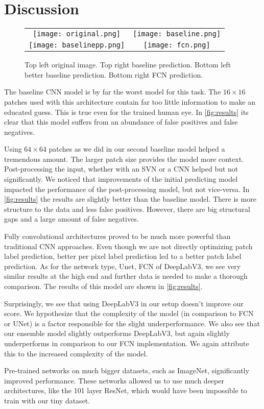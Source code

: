 \section{Discussion}
\begin{figure}[h]
    \centering
    \begin{tabular}{cc}
        \texttt{[image: original.png]} & \texttt{[image: baseline.png]} \\
        \texttt{[image: baselinepp.png]} & \texttt{[image: fcn.png]} \\
    \end{tabular}
    \caption{Top left original image. Top right baseline prediction. Bottom left better baseline prediction. Bottom right FCN prediction.}
    \label{fig:results}
\end{figure}

The baseline CNN model is by far the worst model for this task. The $16 \times 16$ patches used with this architecture contain far too little information to make an educated guess. This is true even for the trained human eye. In \autoref{fig:results} its clear that this model suffers from an abundance of false positives and false negatives.

Using $64 \times 64$ patches as we did in our second baseline model helped a tremendous amount. The larger patch size provides the model more context. Post-processing the input, whether with an SVN or a CNN helped but not significantly. We noticed that improvements of the initial predicting model impacted the performance of the post-processing model, but not vice-versa. In \autoref{fig:results} the results are slightly better than the baseline model. There is more structure to the data and less false positives. However, there are big structural gaps and a large amount of false negatives.

Fully convolutional architectures proved to be much more powerful than traditional CNN approaches. Even though we are not directly optimizing patch label prediction, better per pixel label prediction led to a better patch label prediction. As for the network type, Unet, FCN of DeepLabV3, we see very similar results at the high end and further data is needed to make a thorough comparison. The results of this model are shown in \autoref{fig:results}.

Surprisingly, we see that using DeepLabV3 in our setup doesn't improve our score. We hypothesize that the complexity of the model (in comparison to FCN or UNet) is a factor responsible for the slight underperformance. We also see that our ensemble model slightly outperforms DeepLabV3, but again slightly underperforms in comparison to our FCN implementation. We again attribute this to the increased complexity of the model.

Pre-trained networks on much bigger datasets, such as ImageNet, significantly improved performance. These networks allowed us to use much deeper architectures, like the 101 layer ResNet, which would have been impossible to train with our tiny dataset.
